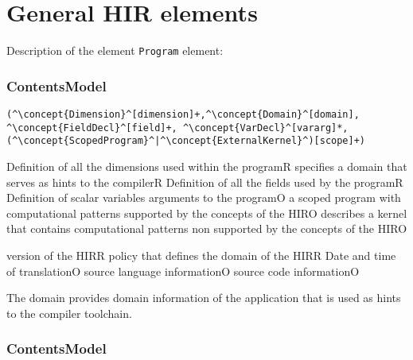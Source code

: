 \section{General HIR elements}


Description of the element {\tt Program} element:

\subsubsection*{ContentsModel}{}

\begin{lstlisting}[style=default]
(^\concept{Dimension}^[dimension]+,^\concept{Domain}^[domain], ^\concept{FieldDecl}^[field]+, ^\concept{VarDecl}^[vararg]*, (^\concept{ScopedProgram}^|^\concept{ExternalKernel}^)[scope]+)
\end{lstlisting}

\begin{HIRChildElements}
{Definition of all the dimensions used within the program}{R}
{specifies a domain that serves as hints to the compiler}{R}
{Definition of all the fields used by the program}{R}
{Definition of scalar variables arguments to the program}{O}
{a scoped program with computational patterns supported by the concepts of the HIR}{O}
{describes a kernel that contains computational patterns non supported by the concepts of the HIR}{O}
\end{HIRChildElements}

\begin{HIRAttributes}
{version of the HIR}{R}
{policy that defines the domain of the HIR}{R}
{Date and time of translation}{O}
{source language information}{O}
{source code information}{O}
\end{HIRAttributes}


The domain provides domain information of the application that is used as hints to the compiler toolchain.

\subsubsection*{ContentsModel}{}

